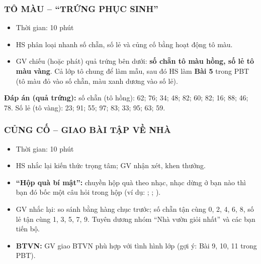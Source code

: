 \documentclass[../main.tex]{subfiles}
\begin{document}
\subsubsection{TÔ MÀU -- “TRỨNG PHỤC SINH”}
\begin{hd}
    \begin{itemize}
        \item Thời gian: 10 phút
        \item HS phân loại nhanh số chẵn, số lẻ và củng cố bằng hoạt động tô màu.
    \end{itemize}
\end{hd}
\begin{itemize}
    \item GV chiếu (hoặc phát) quả trứng bên dưới: \textbf{số chẵn tô màu hồng, số lẻ tô màu vàng}. Cả lớp tô chung để làm mẫu, sau đó HS làm \textbf{Bài 5} trong PBT (tô màu đỏ vào số chẵn, màu xanh dương vào số lẻ).
\end{itemize}
\begin{center}
\end{center}
\begin{luuy}
    \textbf{Đáp án (quả trứng):} số chẵn (tô hồng): 62; 76; 34; 48; 82; 60; 82; 16; 88; 46; 78. Số lẻ (tô vàng): 23; 91; 55; 97; 83; 33; 95; 63; 59.
\end{luuy}

\subsubsection{CỦNG CỐ -- GIAO BÀI TẬP VỀ NHÀ}
\begin{hd}
    \begin{itemize}
        \item Thời gian: 10 phút
        \item HS nhắc lại kiến thức trọng tâm; GV nhận xét, khen thưởng.
    \end{itemize}
\end{hd}
\begin{itemize}
    \item \textbf{“Hộp quà bí mật”:} chuyền hộp quà theo nhạc, nhạc dừng ở bạn nào thì bạn đó bốc một câu hỏi trong hộp (ví dụ: ; ; ).
    \item GV nhắc lại: so sánh bằng hàng chục trước; số chẵn tận cùng 0, 2, 4, 6, 8, số lẻ tận cùng 1, 3, 5, 7, 9. Tuyên dương nhóm “Nhà vườn giỏi nhất” và các bạn tiến bộ.
    \item \textbf{BTVN:} GV giao BTVN phù hợp với tình hình lớp (gợi ý: Bài 9, 10, 11 trong PBT).
\end{itemize}
\end{document}
